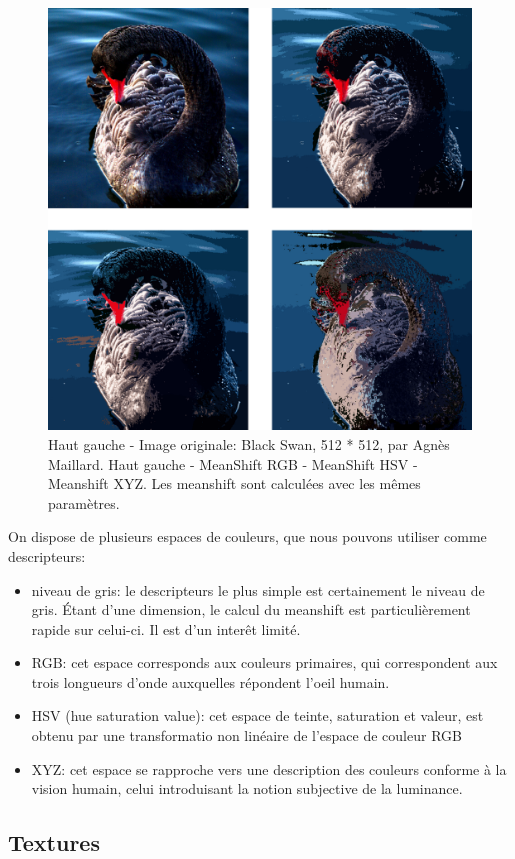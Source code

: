 \documentclass{article}
\begin{document}
\begin{figure}
\includegraphics[width=450px]{images/color_black_swan.png}
\caption{Haut gauche - Image originale: Black Swan, 512 * 512, par Agnès
Maillard. Haut gauche - MeanShift RGB - MeanShift HSV - Meanshift XYZ. Les
meanshift sont calculées avec les mêmes paramètres.}
\end{figure}

On dispose de plusieurs espaces de couleurs, que nous pouvons utiliser comme
descripteurs:

\begin{itemize}
\item niveau de gris: le descripteurs le plus simple est certainement le
niveau de gris. Étant d'une dimension, le calcul du meanshift est
particulièrement rapide sur celui-ci. Il est d'un interêt limité.
\item RGB: cet espace corresponds aux couleurs primaires, qui correspondent
aux trois longueurs d'onde auxquelles répondent l'oeil humain.
\item HSV (hue saturation value): cet espace de teinte, saturation et valeur,
est obtenu par une transformatio non linéaire de l'espace de couleur RGB
\item XYZ: cet espace se rapproche vers une description des couleurs conforme
à la vision humain, celui introduisant la notion subjective de la luminance.
\end{itemize}

\subsection{Textures}
\end{document}
